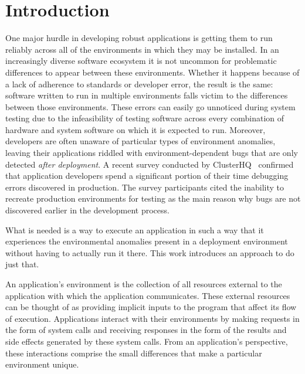 \section{Introduction}

One major hurdle in developing robust applications is getting them to
run reliably across all of the environments in which they may be
installed.  In an increasingly diverse software ecosystem it is not
uncommon for problematic differences to appear between these
environments.  Whether it happens because of a lack of adherence to
standards or developer error, the result is the same: software written
to run in multiple environments falls victim to the differences
between those environments.  These errors can easily go unnoticed
during system testing due to the infeasibility of testing software
across every combination of hardware and system software on which it
is expected to run. Moreover, developers are often unaware
of particular types of environment anomalies, leaving their
applications riddled with environment-dependent bugs that are only
detected \emph{after deployment}. A recent survey conducted by
ClusterHQ~\cite{ClusterHQSurvey} confirmed that application developers
spend a significant portion of their time debugging errors discovered
in production.  The survey participants cited the inability to
recreate production environments for testing as the main reason why
bugs are not discovered earlier in the development process.  

What is needed is a way to execute an application in such a way that
it experiences the environmental anomalies present in a deployment
environment without having to actually run it there.  This work
introduces an approach to do just that.

An application's environment is the collection of all resources
external to the application with which the application communicates.
These external resources can be thought of as providing implicit
inputs to the program that affect its flow of execution. Applications
interact with their environments by making requests in the form of
system calls and receiving responses in the form of the results and
side effects generated by these system calls.  From an application's
perspective, these interactions comprise the small differences that
make a particular environment unique.  

